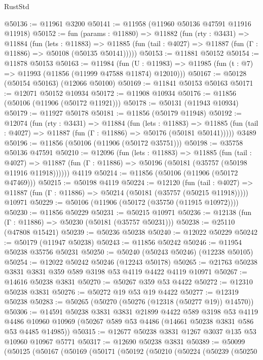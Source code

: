 \begin{lexlean}{RustStd}
\begin{coremodule}
@50136 := @11961 @3200
@50141 := @11958 (@11960 @50136 @47591 @11916 @11918)
@50152 := fun (params : @11880) =>
  @11882
    (fun (rty : @3431) =>
    @11884
      (fun (lets : @11883) =>
      @11885 (fun (tail : @4027) => @11887 (fun (Γ : @11886) => @50108 (@50135 @50141)))))
@50153 := @11881 @50152
@50154 := @11878 @50153
@50163 := @11984
    (fun (U : @11983) => @11985 (fun (t : @7) => @11993 (@11856 (@11999 @47588 @11874) @12010)))
@50167 := @50128 (@50154 @50163) (@12066 @50100)
@50169 := @11841 @50153 @50163
@50171 := @12071 @50152 @10934
@50172 := @11908 @10934
@50176 := @11856 (@50106 (@11906 (@50172 @11921)))
@50178 := @50131 (@11943 @10934)
@50179 := @11927 @50178
@50181 := @11856 (@50179 @11948)
@50192 := @12074
    (fun (rty : @3431) =>
    @11884
      (fun (lets : @11883) =>
      @11885 (fun (tail : @4027) => @11887 (fun (Γ : @11886) => @50176 (@50181 @50141)))))
    @3489
@50196 := @11856 (@50106 (@11906 (@50172 @35751)))
@50198 := @35758 @50136 @47591
@50210 := @12096
    (fun (lets : @11883) =>
    @11885
      (fun (tail : @4027) =>
      @11887 (fun (Γ : @11886) => @50196 (@50181 (@35757 (@50198 @11916 @11918))))))
    @4119
@50214 := @11856 (@50106 (@11906 (@50172 @47469)))
@50215 := @50198 @4119
@50224 := @12120
    (fun (tail : @4027) => @11887 (fun (Γ : @11886) => @50214 (@50181 (@35757 (@50215 @11918)))))
    @10971
@50229 := @50106 (@11906 (@50172 (@35750 (@11915 @10972))))
@50230 := @11856 @50229
@50231 := @50215 @10971
@50236 := @12138 (fun (Γ : @11886) => @50230 (@50181 (@35757 @50231)))
@50238 := @25110 (@47808 @15421)
@50239 := @50236 @50238
@50240 := @12022 @50229
@50242 := @50179 (@11947 @50238)
@50243 := @11856 @50242
@50246 := @11954 @50238 @35756 @50231
@50250 := @50240 (@50243 @50246) (@12238 @50105)
@50254 := @12022 @50242 @50246 (@12243 @50178)
@50265 := @21763 @50238 @3831 @3831 @359 @589 @3198 @53 @4119 @4422 @4119 @10971
@50267 := @14616 @50238 @3831
@50270 := @50267 @359 @53 @4422
@50272 := @12310 @50238 @3831
@50276 := @50272 @19 @53 @19 @4422
@50277 := @12319 @50238
@50283 := @50265 (@50270 (@50276 (@12318 (@50277 @19)) @14570))
@50306 := @14591
    @50238
    @3831
    @3831
    @21899
    @4422
    @589
    @3198
    @53
    @4119
    @4486
    @10960
    @10969
    (@50267 @589 @53 @4486 (@14661 @50238 @3831 @586 @53 @4485 @14985))
@50315 := @12677 @50238 @3831 @1267 @3037 @135 @53 @10960 @10967 @5771
@50317 := @12690 @50238 @3831
@50389 := @50099
    (@50125
      (@50167
        (@50169
          (@50171
            (@50192
              (@50210
                (@50224
                  (@50239
                    (@50250

\end{coremodule}
\end{lexlean}
